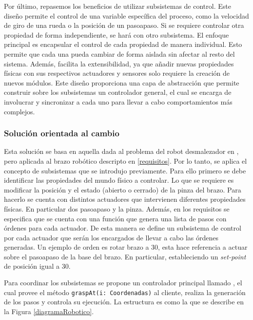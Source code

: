 Por último, repasemos los beneficios de utilizar subsistemas de control. Este diseño permite el control de una variable específica del proceso, como la velocidad de giro de una rueda o la posición de un \gls{pasoapaso}. Si se requiere controlar otra propiedad de forma independiente, se hará con otro subsistema. El enfoque principal es encapsular el control de cada propiedad de manera individual. Esto permite que cada una pueda cambiar de forma aislada sin afectar al resto del sistema. Además, facilita la extensibilidad, ya que añadir nuevas propiedades físicas con sus respectivos actuadores y sensores solo requiere la creación de nuevos módulos. Este diseño proporciona una capa de abstracción que permite construir sobre los subsistemas un controlador general, el cual se encarga de involucrar y sincronizar a cada uno para llevar a cabo comportamientos más complejos.



\subsubsection*{Solución orientada al cambio}

Esta solución se basa en aquella dada al problema del robot desmalezador en \citep{paperPomponio}, pero aplicada al brazo robótico descripto en \ref{requisitos}. Por lo tanto, se aplica el concepto de subsistemas que se introdujo previamente. Para ello primero se debe identificar las propiedades del mundo físico a controlar. Lo que se requiere es modificar la posición y el estado (abierto o cerrado) de la pinza del brazo. Para hacerlo se cuenta con distintos actuadores que intervienen diferentes propiedades físicas. En particular dos \gls{pasoapaso} y la pinza. Además, en los requisitos se especifica que se cuenta con una función que genera una lista de pasos con órdenes para cada actuador. De esta manera se define un subsistema de control por cada actuador que serán los encargados de llevar a cabo las órdenes generadas. Un ejemplo de orden es rotar brazo a 30\textdegree, esta hace referencia a actuar sobre el \gls{pasoapaso} de la base del brazo. En particular, estableciendo un \textit{set-point} de posición igual a 30\textdegree. 


Para coordinar los subsistemas se propone un controlador principal llamado \MainController, el cual provee el método \verb|graspAt(i: Coordenadas)| al cliente, realiza la generación de los pasos y controla su ejecución. La estructura es como la que se describe en la Figura \ref{diagramaRobotico}.


